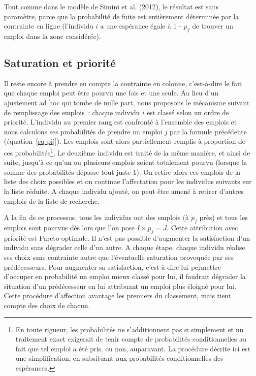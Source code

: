 \documentclass[
  10pt,
  a4paper,
  numbers=noendperiod,
  DIV=9]{scrreprt}
\begin{document}
Tout comme dans le modèle de Simini et al. (2012), le résultat est sans
paramètre, parce que la probabilité de fuite est entièrement déterminée
par la contrainte en ligne (l'individu \(i\) a une espérance égale à 1 -
\(p_f\) de trouver un emploi dans la zone considérée).

\hypertarget{sec-priorite}{%
\subsection{Saturation et priorité}\label{sec-priorite}}

Il reste encore à prendre en compte la contrainte en colonne,
c'est-à-dire le fait que chaque emploi peut être pourvu une fois et une
seule. Au lieu d'un ajustement ad hoc qui tombe de nulle part, nous
proposons le mécanisme suivant de remplissage des emplois~: chaque
individu \(i\) est classé selon un ordre de priorité. L'individu au
premier rang est confronté à l'ensemble des emplois et nous calculons
ses probabilités de prendre un emploi \(j\) par la formule précédente
(équation~\ref{eq-pij}). Les emplois sont alors partiellement remplis à
proportion de ces probabilités\footnote{En toute rigueur, les
  probabilités ne s'additionnent pas si simplement et un traitement
  exact exigerait de tenir compte de probabilités conditionnelles au
  fait que tel emploi a été pris, ou non, auparavant. La procédure
  décrite ici est une simplification, en subsituant aux probabilités
  conditionnelles des espérances.}. Le deuxième individu est traité de
la même manière, et ainsi de suite, jusqu'à ce qu'un ou plusieurs
emplois soient totalement pourvu (lorsque la somme des probabilités
dépasse tout juste 1). On retire alors ces emplois de la liste des choix
possibles et on continue l'affectation pour les individus suivants sur
la liste réduite. A chaque individu ajouté, on peut être amené à retirer
d'autres emplois de la liste de recherche.

A la fin de ce processus, tous les individus ont des emplois (à \(p_f\)
près) et tous les emplois sont pourvus dès lors que l'on pose
\(I \times p_f = J\). Cette attribution avec priorité est
Pareto-optimale. Il n'est pas possible d'augmenter la satisfaction d'un
individu sans dégrader celle d'un autre. A chaque étape, chaque individu
réalise ses choix sans contrainte autre que l'éventuelle saturation
provoquée par ses prédécesseurs. Pour augmenter sa satisfaction,
c'est-à-dire lui permettre d'occuper en probabilité un emploi mieux
classé pour lui, il faudrait dégrader la situation d'un prédécesseur en
lui attribuant un emploi plus éloigné pour lui. Cette procédure
d'affection avantage les premiers du classement, mais tient compte des
choix de chacun.
\end{document}

